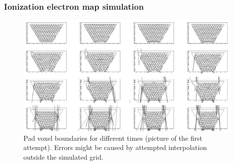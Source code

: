 \documentclass{beamer}
\begin{document}
	\begin{frame}
		\frametitle{Ionization electron map simulation}
		\begin{figure}
			\centering
			\includegraphics[height=0.68\textheight]{images/pads_dist.png}
			\caption{Pad voxel boundaries for different times (picture of the first attempt). Errors might be caused by attempted interpolation outside the simulated grid.}
		\end{figure}
	\end{frame}
	
	
\end{document}
